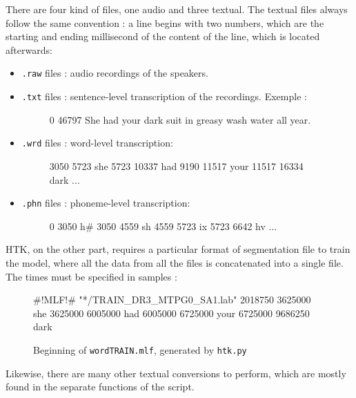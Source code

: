There are four kind of files, one audio and three textual.
The textual files always follow the same convention : a line begins with two numbers, which are the starting and ending millisecond of the content of the line, which is located afterwards:
\begin{itemize}
\item \texttt{.raw} files : audio recordings of the speakers.
\item \texttt{.txt} files : sentence-level transcription of the recordings. Exemple :
\begin{figure}[h]
\centering
\begin{verbbox} 0 46797 She had your dark suit in greasy wash water all year. \end{verbbox}
\theverbbox
\end{figure}
\item \texttt{.wrd} files : word-level transcription:
\begin{figure}[h]
\centering
\begin{verbbox}3050 5723 she
5723 10337 had
9190 11517 your
11517 16334 dark 
...
\end{verbbox}
\theverbbox
\end{figure}
\item \texttt{.phn} files : phoneme-level transcription:
\begin{figure}[h]
\centering
\begin{verbbox}0 3050 h#
3050 4559 sh
4559 5723 ix
5723 6642 hv 
...
\end{verbbox}
\theverbbox
\end{figure}
\end{itemize}

\ac{HTK}, on the other part, requires a particular format of segmentation file to train the model, where all the data from all the files is concatenated into a single file. The times must be specified in samples :
 
\begin{figure}[h]
\centering
\begin{verbbox}
#!MLF!#
"*/TRAIN_DR3_MTPG0_SA1.lab"
2018750 3625000 she
3625000 6005000 had 
6005000 6725000 your 
6725000 9686250 dark 
\end{verbbox}
\theverbbox
\caption{Beginning of \texttt{wordTRAIN.mlf}, generated by \texttt{htk.py}}
\end{figure}

Likewise, there are many other textual conversions to perform, which are mostly found in the separate functions of the script.

